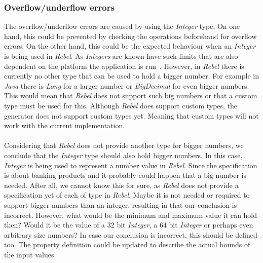 \subsubsection{Overflow/underflow errors}
The overflow/underflow errors are caused by using the \textit{Integer} type. On
one hand, this could be prevented by checking the
operations beforehand for overflow errors. On the other hand, this could be the
expected behaviour when an \textit{Integer} is being used in \textit{Rebel}. As
\textit{Integers} are known have such limits that are also dependent on the
platform the application is run~\cite{wang2009intscope}. However, in
\textit{Rebel} there is currently no other type that can be used to hold a
bigger number. For example in \textit{Java} there is \textit{Long} for a larger
number or \textit{BigDecimal} for even bigger numbers. This would mean that
\textit{Rebel} does not support such big numbers or that a custom type must be used
for this. Although \textit{Rebel} does support custom types, the generator does
not support custom types yet. Meaning that custom types will not work with the
current implementation.\\
\\
Considering that \textit{Rebel} does not provide another type for
bigger numbers, we conclude that the \textit{Integer} type should also
hold bigger numbers. In this case, \textit{Integer} is being used to represent a
number value in \textit{Rebel}. Since the specification is about banking
products and it probably could happen that a big number is needed. After all, we
cannot know this for sure, as \textit{Rebel} does not provide a specification
yet of each of type in \textit{Rebel}. Maybe it is not needed or required to
support bigger numbers than an integer, resulting in that our conclusion is
incorrect. However, what would be the minimum and maximum value it can hold then? Would it be the
value of a 32 bit \textit{Integer}, a 64 bit \textit{Integer} or perhaps even arbitrary size numbers? In case our conclusion is
incorrect, this should be defined too. The property definition could be updated
to describe the actual bounds of the input values.

